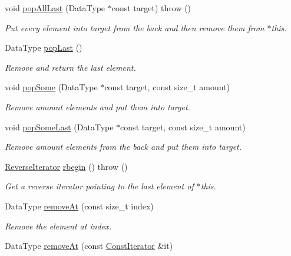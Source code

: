 \begin{DoxyCompactItemize}
void \hyperlink{classVectorDeque_ac7bfa0aed49323c8de6a80f11bc5fd81}{pop\-All\-Last} (Data\-Type $\ast$const target)  throw ()
\begin{DoxyCompactList}\small\item\em Put every element into {\ttfamily target} from the back and then remove them from {\ttfamily $\ast$this}. \end{DoxyCompactList}\item 
Data\-Type \hyperlink{classVectorDeque_a66a109e2ed17317d2b915dfb698148ab}{pop\-Last} ()
\begin{DoxyCompactList}\small\item\em Remove and return the last element. \end{DoxyCompactList}\item 
void \hyperlink{classVectorDeque_a7b2be5c47040434600596e408dd56d31}{pop\-Some} (Data\-Type $\ast$const target, const size\-\_\-t amount)
\begin{DoxyCompactList}\small\item\em Remove {\ttfamily amount} elements and put them into {\ttfamily target}. \end{DoxyCompactList}\item 
void \hyperlink{classVectorDeque_ae3767c6a3236b083c025933c6305c138}{pop\-Some\-Last} (Data\-Type $\ast$const target, const size\-\_\-t amount)
\begin{DoxyCompactList}\small\item\em Remove {\ttfamily amount} elements from the back and put them into {\ttfamily target}. \end{DoxyCompactList}\item 
\hyperlink{classVectorDeque_a6c7645ed21181c82fd1837362a1e5145}{Reverse\-Iterator} \hyperlink{classVectorDeque_ab5afe7cf117463ba11ee7745b92fdd58}{rbegin} ()  throw ()
\begin{DoxyCompactList}\small\item\em Get a reverse iterator pointing to the last element of {\ttfamily $\ast$this}. \end{DoxyCompactList}\item 
Data\-Type \hyperlink{classVectorDeque_a7afdc8063b945a6e10d2bee8781340a6}{remove\-At} (const size\-\_\-t index)
\begin{DoxyCompactList}\small\item\em Remove the element at {\ttfamily index}. \end{DoxyCompactList}\item 
Data\-Type \hyperlink{classVectorDeque_a6143f275084ea8cd415304b290f5f47c}{remove\-At} (const \hyperlink{classVectorDeque_a5cfe4fc61668a1213c99e052450297e6}{Const\-Iterator} \&it)

\end{DoxyCompactItemize}
